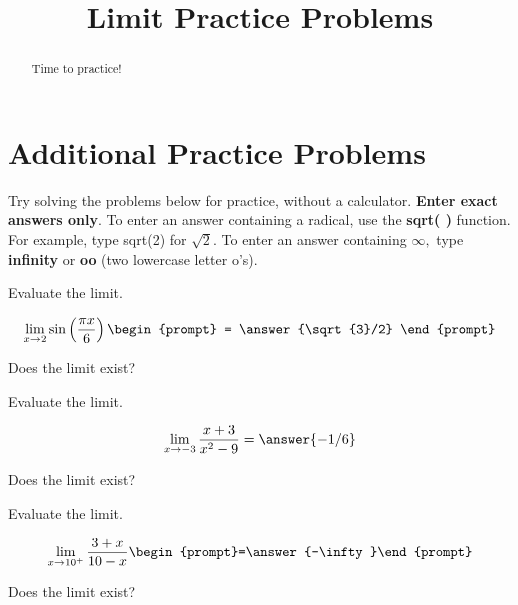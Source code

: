 \documentclass{ximera}
\begin{document}
    \title{Limit Practice Problems}
    \begin{abstract} Time to practice! \end{abstract}
    \maketitle

\section*{Additional Practice Problems}

Try solving the problems below for practice, without a calculator.  \textbf{Enter exact answers only}.  To enter an answer
containing a radical, use the \textbf{sqrt( )} function.  For example, type sqrt(2) for $\sqrt{2}.$  To enter an answer containing 
$\infty,$ type \textbf{infinity} or \textbf{oo} (two lowercase letter o's).

\begin{problem}
Evaluate the limit.

\[ \lim_{x \rightarrow 2} \sin \left( \frac{\pi x}{6} \right)  \begin{prompt} = \answer{\sqrt{3}/2} \end{prompt} \]


Does the limit exist?

\begin{multipleChoice}
  \end{multipleChoice}

\end{problem}


\begin{problem}
Evaluate the limit.

\[ \lim_{x\to -3} \frac{x+3}{x^2-9} =\answer{-1/6} \]


Does the limit exist?


\begin{multipleChoice}
  \end{multipleChoice}

\end{problem}


\begin{problem}
Evaluate the limit.

\[\lim_{x\to 10^+} \frac{3+x}{10-x}  \begin{prompt}=\answer{-\infty}\end{prompt}\]


Does the limit exist?

\begin{multipleChoice}
  \end{multipleChoice}

\end{problem}
\end{document}
